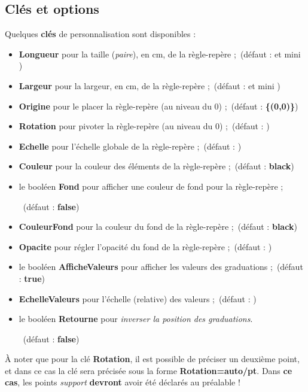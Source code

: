 \documentclass[french,a4paper,11pt]{article}
\newcommand\Cle[1]{{\bfseries\sffamily\textlangle #1\textrangle}}
\begin{document}
\subsection{Clés et options}
%
\begin{tipblock}
Quelques \Cle{clés} de personnalisation sont disponibles :

\begin{itemize}
	\item \Cle{Longueur} pour la taille (\textit{paire}), en cm, de la règle-repère ;\hfill~(défaut : \Cle{12} et mini \Cle{4})
	\item \Cle{Largeur} pour la largeur, en cm, de la règle-repère ;\hfill~(défaut : \Cle{4} et mini \Cle{4})
	\item \Cle{Origine} pour le placer la règle-repère (au niveau du $0$) ;\hfill~(défaut : \Cle{\{(0,0)\}})
	\item \Cle{Rotation} pour pivoter la règle-repère (au niveau du $0$) ;\hfill~(défaut : \Cle{0})
	\item \Cle{Echelle} pour l'échelle globale de la règle-repère ;\hfill~(défaut : \Cle{1})
	\item \Cle{Couleur} pour la couleur des éléments de la règle-repère ;\hfill~(défaut : \Cle{black})
	\item le booléen \Cle{Fond} pour afficher une couleur de fond pour la règle-repère ;
	
	\hfill~(défaut : \Cle{false})
	\item \Cle{CouleurFond} pour la couleur du fond de la règle-repère ;\hfill~(défaut : \Cle{black})
	\item \Cle{Opacite} pour régler l'opacité du fond de la règle-repère ;\hfill~(défaut : \Cle{0.5})
	\item le booléen \Cle{AfficheValeurs} pour afficher les valeurs des graduations ;\hfill~(défaut : \Cle{true})
	\item \Cle{EchelleValeurs} pour l'échelle (relative) des valeurs ;\hfill~(défaut : \Cle{0.8})
	\item le booléen \Cle{Retourne} pour \textit{inverser la position des graduations}.
	
	\hfill~(défaut : \Cle{false})
\end{itemize}

À noter que pour la clé \Cle{Rotation}, il est possible de préciser un deuxième point, et dans ce cas la clé sera précisée sous la forme \Cle{Rotation=auto/pt}. Dans \textbf{ce cas}, les points \textit{support} \textbf{devront} avoir été déclarés au préalable !
\end{tipblock}
\end{document}
